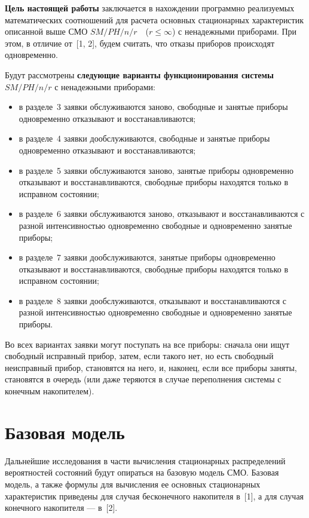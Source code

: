 \begin{multicols}{2}
{\bf Цель настоящей работы} заключается в нахождении программно
реализуемых математических соотношений для расчета основных
стационарных харак\-теристик описанной выше СМО $SM/PH/n/r$\ \
($r\le\infty$) с ненадежными приборами.
При этом, в отли\-чие от~[1, 2], будем считать, что отказы приборов
происходят одновременно.

Будут рассмотрены {\bf следующие варианты функционирования системы}
$SM/PH/n/r$ с ненадежными приборами:
\begin{itemize}
\item в разделе~3 заявки обслуживаются заново, свободные и занятые приборы
одновременно отказывают и восстанавливаются;
\item
в разделе~4 заявки дообслуживаются, свободные и занятые приборы
одновременно отказывают и восстанавливаются;
\item
в разделе~5 заявки обслуживаются заново, занятые приборы одновременно
отказывают и восстанавливаются, свободные приборы находятся только в
исправном состоянии;
\item
в разделе~6 заявки обслуживаются заново, отказывают и
восстанавливаются с разной интенсивностью одновременно свободные и
одновременно занятые приборы;
\item
в разделе~7 заявки дообслуживаются, занятые приборы одновременно
отказывают и восстанавливаются, свободные приборы находятся только
в исправном состоянии;
\item
в разделе~8 заявки дообслуживаются, отказывают и восстанавливаются
с разной ин\-тен\-сив\-ностью одновременно свободные и одновременно занятые
приборы.
\end{itemize}

Во всех вариантах заявки могут поступать на все приборы:
сначала они ищут свободный исправный прибор, затем, если такого нет,
но есть свободный неисправный прибор, становятся на него, и, наконец,
если все приборы заняты, становятся в очередь (или даже теряются
в случае переполнения системы с конечным накопителем).

\section{Базовая модель}    %

Дальнейшие исследования в части вычисления стационарных
распределений вероятностей состояний будут опираться на
базовую модель СМО.
Базовая модель, а также формулы для вычисления ее основных
стационарных характеристик приведены для случая бесконечного
накопителя в~[1], а для случая конечного накопителя --- в~[2].


\end{multicols}
